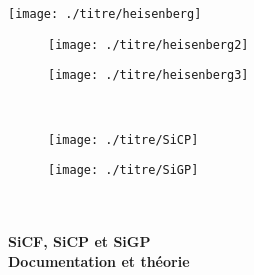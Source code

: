 \begin{titlepage}
\begin{center}

\texttt{[image: ./titre/heisenberg]}
\label{fig:image1}
~\\[1cm]

\begin{figure}[htbp]
\begin{minipage}[c]{.45\linewidth}
\begin{center}
\texttt{[image: ./titre/heisenberg2]}
\end{center}
\end{minipage}
\hfill
\begin{minipage}[c]{.45\linewidth}
\begin{center}
\texttt{[image: ./titre/heisenberg3]}
\end{center}
\end{minipage}
\end{figure}
~\\[1cm]

\begin{figure}[htbp]
\begin{minipage}[c]{.45\linewidth}
\begin{center}
\texttt{[image: ./titre/SiCP]}
\end{center}
\end{minipage}
\hfill
\begin{minipage}[c]{.45\linewidth}
\begin{center}
\texttt{[image: ./titre/SiGP]}
\end{center}
\end{minipage}
\end{figure}

\textsc{\Large }\\[0.5cm]

\HRule \\[0.4cm]

{\huge \bfseries  SiCF, SiCP et SiGP\\
Documentation et théorie\\[0.4cm] }


\end{center}
\end{titlepage}
